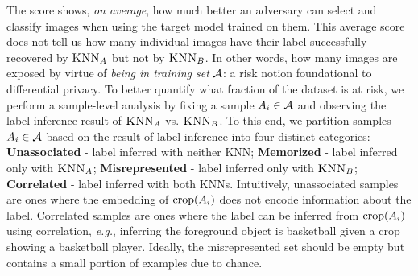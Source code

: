 The \dejavu score shows, \emph{on average}, how much better an adversary can select and classify images when using the target model trained on them. 
This average score does not tell us how many individual images have their label successfully recovered by $\textsc{KNN}_A$ but not by $\textsc{KNN}_B$. In other words, how many images are exposed by virtue of \emph{being in training set} $\mathcal{A}$: a risk notion foundational to differential privacy. 
To better quantify what fraction of the dataset is at risk, we perform a sample-level analysis by fixing a sample $A_i \in \mathcal{A}$ and observing the label inference result of $\textsc{KNN}_A$ vs. $\textsc{KNN}_B$.
To this end, we partition samples $A_i \in \mathcal{A}$ based on the result of label inference into four distinct categories: {\color{gray}\textbf{Unassociated}} - label inferred with neither KNN; {\color{part_orange}\textbf{Memorized}} - label inferred only with $\textsc{KNN}_A$; {\color{part_red}\textbf{Misrepresented}} - label inferred only with $\textsc{KNN}_B$; {\color{part_blue}\textbf{Correlated}} - label inferred with both KNNs. 
Intuitively, {\color{gray}unassociated} samples are ones where the embedding of $\mathrm{crop}({A_i})$ does not encode information about the label. {\color{part_blue}Correlated} samples are ones where the label can be inferred from $\mathrm{crop}({A_i})$ using correlation, \emph{e.g.}, inferring the foreground object is basketball given a crop showing a basketball player. Ideally, the {\color{part_red}misrepresented} set should be empty but contains a small portion of examples due to chance.
